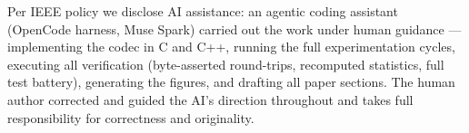 \documentclass[smallabstract,smallcaptions]{dccpaper}
\begin{document}

Per IEEE policy we disclose AI assistance: an agentic coding assistant
(OpenCode harness, Muse Spark) carried out the work under human guidance —
implementing the codec in C and C++, running the full
experimentation cycles, executing all verification (byte-asserted round-trips,
recomputed statistics, full test battery), generating the figures,
and drafting all paper sections. The human author corrected and guided
the AI's direction throughout and takes full responsibility for correctness
and originality.

{\small
{\small\sloppy
\clearpage


}
}
\end{document}
